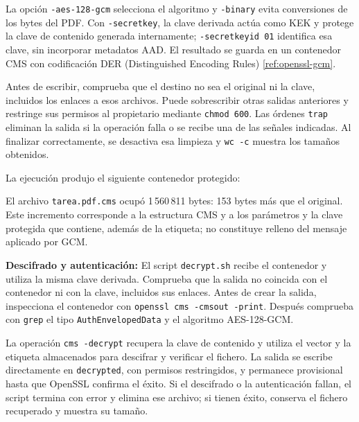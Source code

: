 La opción \texttt{-aes-128-gcm} selecciona el algoritmo y \texttt{-binary} evita conversiones de los bytes del PDF. Con \texttt{-secretkey}, la clave derivada actúa como KEK y protege la clave de contenido generada internamente; \texttt{-secretkeyid 01} identifica esa clave, sin incorporar metadatos AAD. El resultado se guarda en un contenedor CMS con codificación DER (Distinguished Encoding Rules) \ref{ref:openssl-gcm}.

Antes de escribir, comprueba que el destino no sea el original ni la clave, incluidos los enlaces a esos archivos. Puede sobrescribir otras salidas anteriores y restringe sus permisos al propietario mediante \texttt{chmod 600}. Las órdenes \texttt{trap} eliminan la salida si la operación falla o se recibe una de las señales indicadas. Al finalizar correctamente, se desactiva esa limpieza y \texttt{wc -c} muestra los tamaños obtenidos.

\begingroup
\renewcommand{\lstlistingname}{Script}

\endgroup

La ejecución produjo el siguiente contenedor protegido:

\noindent\begin{minipage}{\linewidth}
\begingroup
\renewcommand{\lstlistingname}{Salida y verificación}

\endgroup
\end{minipage}

El archivo \texttt{tarea.pdf.cms} ocupó 1\,560\,811 bytes: 153 bytes más que el original. Este incremento corresponde a la estructura CMS y a los parámetros y la clave protegida que contiene, además de la etiqueta; no constituye relleno del mensaje aplicado por GCM.

\textbf{Descifrado y autenticación:} El script \texttt{decrypt.sh} recibe el contenedor y utiliza la misma clave derivada. Comprueba que la salida no coincida con el contenedor ni con la clave, incluidos sus enlaces. Antes de crear la salida, inspecciona el contenedor con \texttt{openssl cms -cmsout -print}. Después comprueba con \texttt{grep} el tipo \texttt{AuthEnvelopedData} y el algoritmo AES-128-GCM.

La operación \texttt{cms -decrypt} recupera la clave de contenido y utiliza el vector y la etiqueta almacenados para descifrar y verificar el fichero. La salida se escribe directamente en \texttt{decrypted}, con permisos restringidos, y permanece provisional hasta que OpenSSL confirma el éxito. Si el descifrado o la autenticación fallan, el script termina con error y elimina ese archivo; si tienen éxito, conserva el fichero recuperado y muestra su tamaño.

